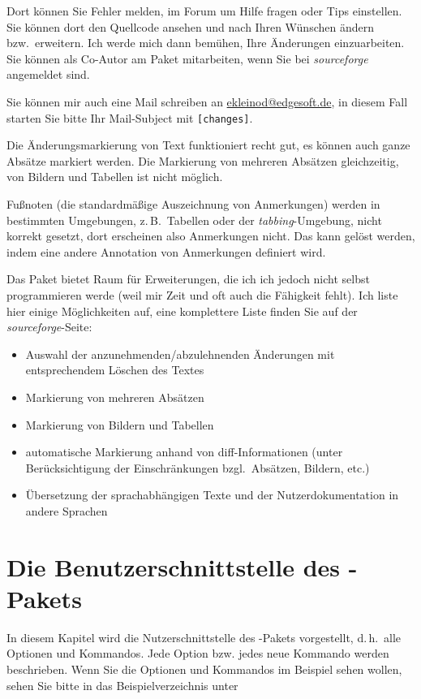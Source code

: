 

Dort können Sie Fehler melden, im Forum um Hilfe fragen oder Tips einstellen.
Sie können dort den Quellcode ansehen und nach Ihren Wünschen ändern bzw.\ erweitern.
Ich werde mich dann bemühen, Ihre Änderungen einzuarbeiten.
Sie können als Co-Autor am Paket mitarbeiten, wenn Sie bei \emph{sourceforge} angemeldet sind.

Sie können mir auch eine Mail schreiben an \href{mailto:ekleinod@edgesoft.de}{ekleinod@edgesoft.de}, in diesem Fall starten Sie bitte Ihr Mail-Subject mit \texttt{[changes]}.

Die Änderungsmarkierung von Text funktioniert recht gut, es können auch ganze Absätze markiert werden.
Die Markierung von mehreren Absätzen gleichzeitig, von Bildern und Tabellen ist nicht möglich.

Fußnoten (die standardmäßige Auszeichnung von Anmerkungen) werden in bestimmten Umgebungen, z.\,B.\ Tabellen oder der \emph{tabbing}-Umgebung, nicht korrekt gesetzt, dort erscheinen also Anmerkungen nicht.
Das kann gelöst werden, indem eine andere Annotation von Anmerkungen definiert wird.

Das Paket bietet Raum für Erweiterungen, die ich ich jedoch nicht selbst programmieren werde (weil mir Zeit und oft auch die Fähigkeit fehlt).
Ich liste hier einige Möglichkeiten auf, eine komplettere Liste finden Sie auf der \emph{sourceforge}-Seite:
\begin{itemize}
	\item Auswahl der anzunehmenden/abzulehnenden Änderungen mit entsprechendem Löschen des Textes
	\item Markierung von mehreren Absätzen
	\item Markierung von Bildern und Tabellen
	\item automatische Markierung anhand von diff-Informationen (unter Berücksichtigung der Einschränkungen bzgl.\ Absätzen, Bildern, etc.)
	\item Übersetzung der sprachabhängigen Texte und der Nutzerdokumentation in andere Sprachen
\end{itemize}



\section{Die Benutzerschnittstelle des -Pakets}
\label{sec:user}

In diesem Kapitel wird die Nutzerschnittstelle des -Pakets vorgestellt, d.\,h.\ alle Optionen und Kommandos.
Jede Option bzw. jedes neue Kommando werden beschrieben.
Wenn Sie die Optionen und Kommandos im Beispiel sehen wollen, sehen Sie bitte in das Beispielverzeichnis unter

